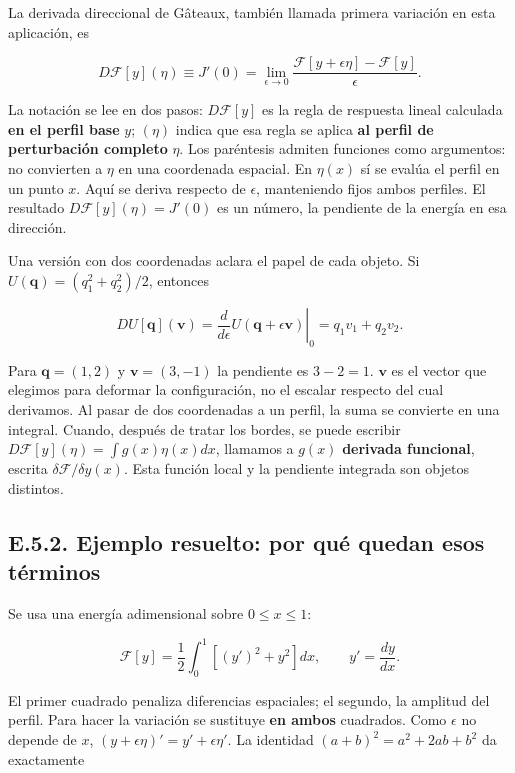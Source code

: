 \documentclass[
  spanish,
  10pt,
  a4paper,
]{article}
\begin{document}
La derivada direccional de Gâteaux, también llamada primera variación en
esta aplicación, es

\[
D\mathcal F[y](\eta)
\equiv J'(0)
=\lim_{\epsilon\to0}
\frac{\mathcal F[y+\epsilon\eta]-\mathcal F[y]}{\epsilon}.
\tag{E.8}
\]

La notación se lee en dos pasos: \(D\mathcal F[y]\) es la regla de
respuesta lineal calculada \textbf{en el perfil base} \(y\); \((\eta)\)
indica que esa regla se aplica \textbf{al perfil de perturbación
completo} \(\eta\). Los paréntesis admiten funciones como argumentos: no
convierten a \(\eta\) en una coordenada espacial. En \(\eta(x)\) sí se
evalúa el perfil en un punto \(x\). Aquí se deriva respecto de
\(\epsilon\), manteniendo fijos ambos perfiles. El resultado
\(D\mathcal F[y](\eta)=J'(0)\) es un número, la pendiente de la energía
en esa dirección.

Una versión con dos coordenadas aclara el papel de cada objeto. Si
\(U(\mathbf q)=(q_1^2+q_2^2)/2\), entonces

\[
DU[\mathbf q](\mathbf v)
=\left.\frac{d}{d\epsilon}U(\mathbf q+\epsilon\mathbf v)\right|_0
=q_1v_1+q_2v_2.
\tag{E03.a}
\]

Para \(\mathbf q=(1,2)\) y \(\mathbf v=(3,-1)\) la pendiente es
\(3-2=1\). \(\mathbf v\) es el vector que elegimos para deformar la
configuración, no el escalar respecto del cual derivamos. Al pasar de
dos coordenadas a un perfil, la suma se convierte en una integral.
Cuando, después de tratar los bordes, se puede escribir
\(D\mathcal F[y](\eta)=\int g(x)\eta(x)dx\), llamamos a \(g(x)\)
\textbf{derivada funcional}, escrita \(\delta\mathcal F/\delta y(x)\).
Esta función local y la pendiente integrada son objetos distintos.

\subsection{E.5.2. Ejemplo resuelto: por qué quedan esos
términos}\label{e.5.2.-ejemplo-resuelto-por-quuxe9-quedan-esos-tuxe9rminos}

Se usa una energía adimensional sobre \(0\leq x\leq1\):

\[
\mathcal F[y]=\frac12\int_0^1[(y')^2+y^2]dx,
\qquad y'=\frac{dy}{dx}.
\tag{E.9}
\]

El primer cuadrado penaliza diferencias espaciales; el segundo, la
amplitud del perfil. Para hacer la variación se sustituye \textbf{en
ambos} cuadrados. Como \(\epsilon\) no depende de \(x\),
\((y+\epsilon\eta)'=y'+\epsilon\eta'\). La identidad
\((a+b)^2=a^2+2ab+b^2\) da exactamente
\end{document}
